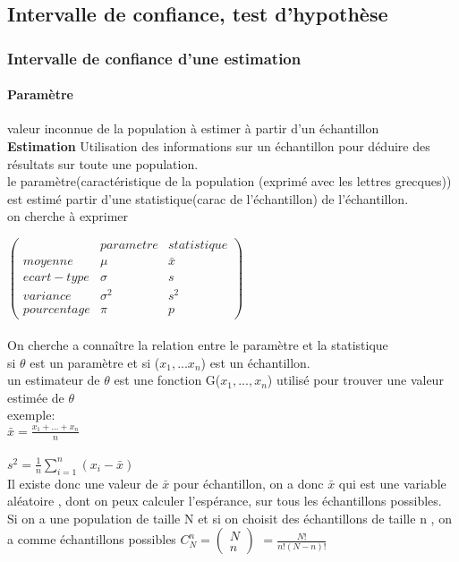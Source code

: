 \documentclass{article}
\begin{document}
\subsection{Intervalle de confiance, test d'hypothèse}
\subsubsection{Intervalle de confiance d'une estimation} 
\paragraph{Paramètre}
valeur inconnue de la population à estimer à partir d'un échantillon\\\textbf{Estimation} Utilisation des informations sur un échantillon pour déduire des résultats sur toute une population.\\le paramètre(caractéristique de la population (exprimé avec les lettres grecques)) est estimé partir d'une statistique(carac de l'échantillon) de l'échantillon.\\on cherche à exprimer\\
\begin{center}

$\begin{pmatrix}
 & parametre & statistique \\
 moyenne & \mu & \bar{x} \\
 ecart-type & \sigma & s \\
 variance & \sigma^2 & s^2 \\
 pourcentage & \pi & p
\end{pmatrix}$

\end{center}
\paragraph{} On cherche a connaître la relation entre le paramètre et la statistique\\si $\theta$ est un paramètre et si ($x_1,...x_n$) est un échantillon.\\un estimateur de $\theta$ est une fonction G($x_1,...,x_n$) utilisé pour trouver une valeur estimée de $\theta$\\exemple: \\
$\bar{x} = \frac{x_1+...+x_n}{n}$\\\\

$s^2 = \frac{1}{n} \sum_{i=1}^n (x_i -  \bar{x})$\\
Il existe donc une valeur de $\bar{x}$ pour échantillon, on a donc $\bar{x}$ qui est une variable aléatoire , dont on peux calculer l'espérance, sur tous les échantillons possibles.\\
Si on a une population de taille N et si on choisit des échantillons de taille n , on a comme échantillons possibles $C_N^n = \begin{pmatrix}
N \\ n
\end{pmatrix}$ $=\frac{N!}{n!(N-n)!}$
\end{document}
